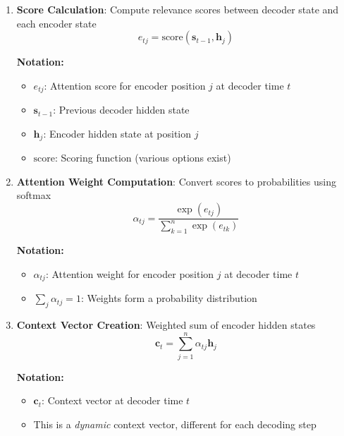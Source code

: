\begin{enumerate}
    \item \textbf{Score Calculation}: Compute relevance scores between decoder state and each encoder state
    \begin{equation}
    e_{tj} = \text{score}(\mathbf{s}_{t-1}, \mathbf{h}_j)
    \end{equation}
    \begin{notationbox}
    \textbf{Notation:}
    \begin{itemize}
        \item $e_{tj}$: Attention score for encoder position $j$ at decoder time $t$
        \item $\mathbf{s}_{t-1}$: Previous decoder hidden state
        \item $\mathbf{h}_j$: Encoder hidden state at position $j$
        \item $\text{score}$: Scoring function (various options exist)
    \end{itemize}
    \end{notationbox}

    \item \textbf{Attention Weight Computation}: Convert scores to probabilities using softmax
    \begin{equation}
    \alpha_{tj} = \frac{\exp(e_{tj})}{\sum_{k=1}^{n} \exp(e_{tk})}
    \end{equation}
    \begin{notationbox}
    \textbf{Notation:}
    \begin{itemize}
        \item $\alpha_{tj}$: Attention weight for encoder position $j$ at decoder time $t$
        \item $\sum_{j} \alpha_{tj} = 1$: Weights form a probability distribution
    \end{itemize}
    \end{notationbox}

    \item \textbf{Context Vector Creation}: Weighted sum of encoder hidden states
    \begin{equation}
    \mathbf{c}_t = \sum_{j=1}^{n} \alpha_{tj} \mathbf{h}_j
    \end{equation}
    \begin{notationbox}
    \textbf{Notation:}
    \begin{itemize}
        \item $\mathbf{c}_t$: Context vector at decoder time $t$
        \item This is a \textit{dynamic} context vector, different for each decoding step
    \end{itemize}
    \end{notationbox}
\end{enumerate}

